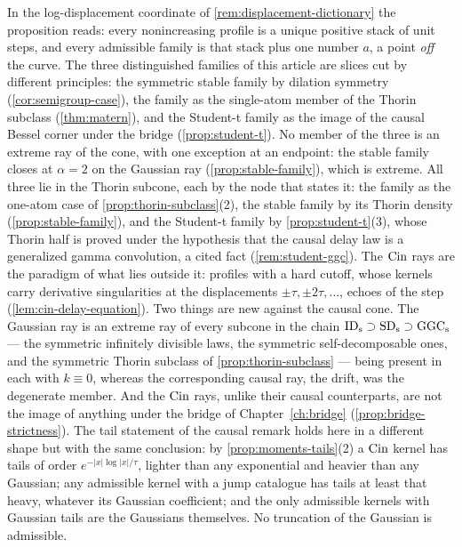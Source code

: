 \begin{remark}\label{rem:cone-shape}
In the log-displacement coordinate of \ref{rem:displacement-dictionary} the proposition reads:
every nonincreasing profile is a unique positive stack of unit steps, and every admissible
family is that stack plus one number $a$, a point \emph{off} the curve. The three distinguished
families of this article are slices cut by different principles: the
symmetric stable family by dilation symmetry (\ref{cor:semigroup-case}), the \Matern{} family as
the single-atom member of the Thorin subclass (\ref{thm:matern}), and the Student-t family as
the image of the causal Bessel corner under the bridge (\ref{prop:student-t}). No member of the
three is an extreme ray of the cone, with one exception at an endpoint: the stable family closes
at $\alpha = 2$ on the Gaussian ray (\ref{prop:stable-family}), which is extreme. All three
lie in the Thorin subcone, each by the node that states it: the \Matern{} family as the one-atom
case of \ref{prop:thorin-subclass}(2), the stable family by its Thorin density
(\ref{prop:stable-family}), and the Student-t family by \ref{prop:student-t}(3), whose Thorin
half is proved under the hypothesis that the causal delay law is a generalized gamma
convolution, a cited fact (\ref{rem:student-ggc}). The $\operatorname{Cin}$ rays are the paradigm of
what lies outside it: profiles with a hard cutoff, whose kernels carry derivative singularities
at the displacements $\pm\tau, \pm2\tau, \dots$, echoes of the step
(\ref{lem:cin-delay-equation}). Two things are new against the causal cone. The Gaussian ray is
an extreme ray of every subcone in the chain
$\mathrm{ID}_{\mathrm{s}} \supset \mathrm{SD}_{\mathrm{s}} \supset \mathrm{GGC}_{\mathrm{s}}$ --- the symmetric infinitely divisible laws, the symmetric
self-decomposable ones, and the symmetric Thorin subclass of \ref{prop:thorin-subclass} --- being present
in each with $k \equiv 0$, whereas the corresponding causal ray, the drift, was the degenerate
member. And the $\operatorname{Cin}$ rays, unlike their causal counterparts, are not the image of anything
under the bridge of Chapter~\ref{ch:bridge} (\ref{prop:bridge-strictness}). The tail statement
of the causal remark holds here in a different shape but with the same conclusion: by
\ref{prop:moments-tails}(2) a $\operatorname{Cin}$ kernel has tails of order $e^{-|x|\log|x|/\tau}$, lighter
than any exponential and heavier than any Gaussian; any admissible kernel with a jump catalogue
has tails at least that heavy, whatever its Gaussian coefficient; and the only admissible
kernels with Gaussian tails are the Gaussians themselves. No truncation of the Gaussian is
admissible.
\end{remark}

